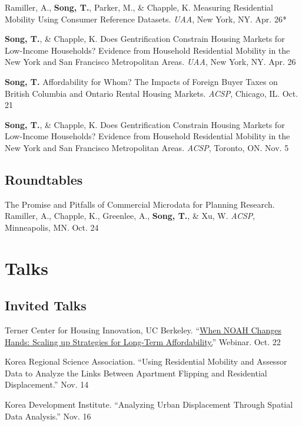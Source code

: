 \documentclass[11pt,letterpaper]{article}
\begin{document}
\begin{tablist}
  \item[2024] \tab{}Ramiller, A., \textbf{Song, T.}, Parker, M., \& Chapple, K. Measuring Residential Mobility Using Consumer Reference Datasets.
    \emph{UAA}, New York, NY. Apr. 26*

  \item[2024] \tab{}\textbf{Song, T.}, \& Chapple, K. Does Gentrification Constrain Housing Markets for Low-Income Households? Evidence from Household Residential Mobility in the New York and San Francisco Metropolitan Areas.
    \emph{UAA}, New York, NY. Apr. 26

  \item[2023] \tab{}\textbf{Song, T.} Affordability for Whom? The Impacts of Foreign Buyer Taxes on British Columbia and Ontario Rental Housing Markets.
    \emph{ACSP}, Chicago, IL. Oct. 21

  \item[2022] \tab{}\textbf{Song, T.}, \& Chapple, K. Does Gentrification Constrain Housing Markets for Low-Income Households? Evidence from Household Residential Mobility in the New York and San Francisco Metropolitan Areas.
    \emph{ACSP}, Toronto, ON. Nov. 5
\end{tablist}


\subsection{Roundtables}
\begin{tablist}
  \item[2025] \tab{}The Promise and Pitfalls of Commercial Microdata for Planning Research. Ramiller, A., Chapple, K., Greenlee, A., \textbf{Song, T.}, \& Xu, W. \emph{ACSP}, Minneapolis, MN. Oct. 24
\end{tablist}

\section{Talks}

\subsection{Invited Talks}
\begin{tablist}
  \item[2026] \tab{}Terner Center for Housing Innovation, UC Berkeley. ``\href{https://ternercenter.berkeley.edu/blog/when-noah-changes-hands-scaling-up-strategies-for-long-term-affordability/}{When NOAH Changes Hands: Scaling up Strategies for Long-Term Affordability.}'' Webinar. Oct. 22
  \item[2024] \tab{}Korea Regional Science Association. ``Using Residential Mobility and Assessor Data to Analyze the Links Between Apartment Flipping and Residential Displacement.'' Nov. 14
  \item[2022] \tab{}Korea Development Institute. ``Analyzing Urban Displacement Through Spatial Data Analysis.'' Nov. 16
\end{tablist}
\end{document}
